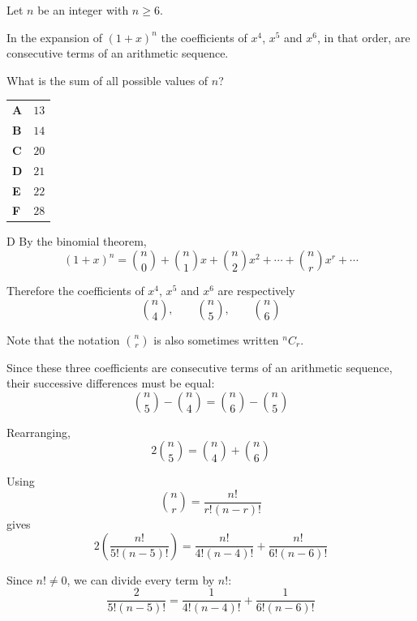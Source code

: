 \documentclass[11pt,a4paper]{article}
\begin{document}
\begin{enumerate}[label=\textbf{\arabic*.},leftmargin=*,itemsep=0pt,start=16]
Let $n$ be an integer with $n \ge 6$. 

In the expansion of $(1+x)^n$ the coefficients of $x^4$, $x^5$ and $x^6$, in that order, are consecutive terms of an arithmetic sequence.

What is the sum of all possible values of $n$?

\par\vspace*{12pt}
\begin{tabularx}{\linewidth}{@{}>{\bfseries}l Y@{}}
A &
$13$
\\[0.8em]
B &
$14$
\\[0.8em]
C &
$20$
\\[0.8em]
D &
$21$
\\[0.8em]
E &
$22$
\\[0.8em]
F &
$28$
\\
\end{tabularx}

\begin{djsSolution}{D}
By the binomial theorem,
\[
(1+x)^n
=
\binom{n}{0}
+\binom{n}{1}x
+\binom{n}{2}x^2
+\cdots
+\binom{n}{r}x^r
+\cdots
\]

Therefore the coefficients of \(x^4\), \(x^5\) and \(x^6\) are respectively
\[
\binom{n}{4},
\qquad
\binom{n}{5},
\qquad
\binom{n}{6}
\]

Note that the notation \(\binom{n}{r}\) is also sometimes written \({}^nC_r\).

Since these three coefficients are consecutive terms of an arithmetic sequence, their successive differences must be equal:
\[
\binom{n}{5}-\binom{n}{4}
=
\binom{n}{6}-\binom{n}{5}
\]

Rearranging,
\[
2\binom{n}{5}
=
\binom{n}{4}+\binom{n}{6}
\]

Using
\[
\binom{n}{r}
=
\frac{n!}{r!(n-r)!}
\]
gives
\[
2\left(\frac{n!}{5!(n-5)!}\right)
=
\frac{n!}{4!(n-4)!}
+
\frac{n!}{6!(n-6)!}
\]

Since \(n!\neq0\), we can divide every term by \(n!\):
\[
\frac{2}{5!(n-5)!}
=
\frac{1}{4!(n-4)!}
+
\frac{1}{6!(n-6)!}
\]


\end{djsSolution}
\end{enumerate}
\end{document}
